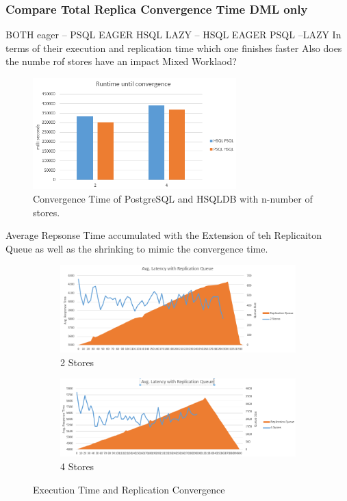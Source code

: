 

\subsubsection{Compare Total Replica Convergence Time DML only } 

BOTH eager  -- PSQL EAGER HSQL LAZY -- HSQL EAGER PSQL --LAZY
In terms of their execution and replication time which one finishes faster
Also does the numbe rof stores have an impact
Mixed Worklaod?

\begin{figure}[t] 
    \centering 
    \includegraphics[width=0.7\textwidth]{Figures/runtime_convergence24.PNG}
    \caption{Convergence Time of PostgreSQL and HSQLDB with n-number of stores.}
    \label{fig:store_comparision}
\end{figure}


Average Repsonse Time accumulated with the Extension of teh Replicaiton Queue as well as the shrinking
to mimic the convergence time. 


\begin{figure}
    \centering
    \begin{subfigure}{.5\textwidth}
      \centering
      \includegraphics[width=.9\linewidth]{Figures/2latency_queue.PNG}
      \caption{2 Stores}
      \label{fig:converge_2}
    \end{subfigure}%
    \begin{subfigure}{.5\textwidth}
      \centering
      \includegraphics[width=.9\linewidth]{Figures/4latence_queue.PNG}
      \caption{4 Stores}
      \label{fig:converge_4}
    \end{subfigure}
    \caption{Execution Time and Replication Convergence}
    \label{fig:converge_24}
\end{figure}




